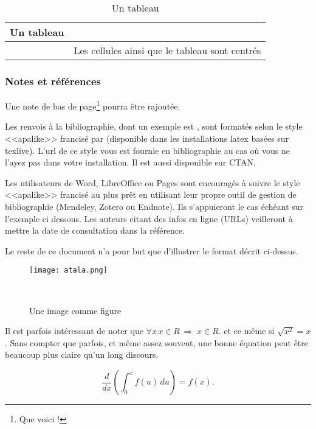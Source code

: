 \documentclass[10pt,a4paper,twoside]{article}
\begin{document}
\begin{table}[!h]
\centering
	\begin{tabular}{|c|p{4cm}|}
	\hline
	Un tableau&\\
	\hline
	&Les cellules ainsi que le tableau sont centrés\\
	\hline
	\end{tabular}
\caption{Un tableau}\label{table}
\end{table}

\subsubsection{Notes et références}

Une note de bas de page\footnote{Que voici !} pourra être rajoutée.

Les renvois à la bibliographie, dont un exemple est \cite{Bernhard07}, sont formatés selon le style <<apalike>> francisé par \cite{apalikefr} (disponible dans les installations latex basées sur texlive). L'url de ce style vous est fournie en bibliographie au cas où vous ne l'ayez pas dans votre installation. Il est aussi disponible sur CTAN.

Les utilisateurs de Word, LibreOffice ou Pages sont encouragés à suivre le style <<apalike>> francisé au plus prêt en utilisant leur propre outil de gestion de bibliographie (Mendeley, Zotero ou Endnote). Ils s'appuieront le cas échéant sur l'exemple ci dessous. Les auteurs citant des infos en ligne (URLs) veilleront à mettre la date de consultation dans la référence.

Le reste de ce document n'a pour but que d'illustrer le format décrit ci-dessus.

\begin{figure}[htbp] 
\begin{center} 
\texttt{[image: atala.png]}
\end{center} 
\caption{Une image comme figure} \label{image} \
\end{figure}

\lipsum[4]


Il est parfois intéressant de noter que $\forall x \, x \in R \,\Rightarrow\; x \in R$. et ce même si $\sqrt{x^2} = x$. Sans compter que parfois, et même assez souvent, une bonne équation peut être beaucoup plus claire qu'un long discours.

	\[
        \frac{d}{dx}\left( \int_{0}^{x} f(u)\,du\right)=f(x).
     \]


\lipsum[6-7]
\end{document}
